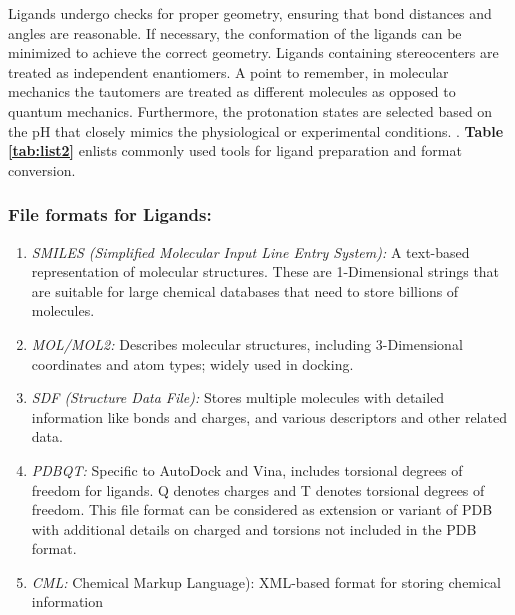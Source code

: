 Ligands undergo checks for proper geometry, ensuring that bond distances and angles are reasonable. If necessary, the conformation of the ligands can be minimized to achieve the correct geometry. {}
Ligands containing stereocenters are treated as independent enantiomers. A point to remember, in molecular mechanics the tautomers are treated as different molecules as opposed to quantum mechanics. {} Furthermore, the protonation states are selected based on the pH that closely mimics the physiological or experimental conditions. {}. \textbf{Table \ref{tab:list2}} enlists commonly used tools for ligand preparation and format conversion. 

\subsubsection*{File formats for Ligands:}
\begin{enumerate}
        \item \textit{SMILES (Simplified Molecular Input Line Entry System):} A text-based representation of molecular structures. These are 1-Dimensional strings that are suitable for large chemical databases that need to store billions of molecules. 
	   \item \textit{MOL/MOL2:} Describes molecular structures, including 3-Dimensional coordinates and atom types; widely used in docking.
	   \item \textit{SDF (Structure Data File):} Stores multiple molecules with detailed information like bonds and charges, and various descriptors and other related data. 
	   \item \textit{PDBQT:} Specific to AutoDock and Vina, includes torsional degrees of freedom for ligands. Q denotes charges and T denotes torsional degrees of freedom. This file format can be considered as extension or variant of PDB with additional details on charged and torsions not included in the PDB format. 
	   \item \textit{CML:} Chemical Markup Language): XML-based format for storing chemical information
\end{enumerate}


